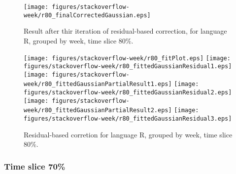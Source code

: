 \begin{figure}[]
\centering
{\texttt{[image: figures/stackoverflow-week/r80\_finalCorrectedGaussian.eps]}}
\caption{Result after thir iteration of residual-based correction, for language R, grouped by week, time slice 80\%.}
\end{figure}


\begin{figure}[hb]
\centering
{}
{\texttt{[image: figures/stackoverflow-week/r80\_fitPlot.eps]}}
{\texttt{[image: figures/stackoverflow-week/r80\_fittedGaussianResidual1.eps]}}
{\texttt{[image: figures/stackoverflow-week/r80\_fittedGaussianPartialResult1.eps]}}
{\texttt{[image: figures/stackoverflow-week/r80\_fittedGaussianResidual2.eps]}}
{\texttt{[image: figures/stackoverflow-week/r80\_fittedGaussianPartialResult2.eps]}}
{\texttt{[image: figures/stackoverflow-week/r80\_fittedGaussianResidual3.eps]}}
\caption{Residual-based corretion for language R, grouped by week, time slice 80\%.}
\end{figure}


\clearpage 
\newpage 


\FloatBarrier

\subsubsection{Time slice 70\%}

